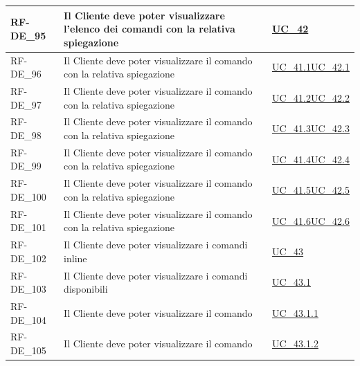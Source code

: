 \begin{longtable}{|>{\raggedright}p{}|>{\raggedright\arraybackslash}p{}|>{\raggedright\arraybackslash}p{}|}
	\hline
	RF-DE\_95 \hypertarget{rf-de_95} & Il Cliente deve poter visualizzare l'elenco dei comandi con la relativa spiegazione & \hyperref[uc_42]{UC\_42} \\
	\hline
	RF-DE\_96 \hypertarget{rf-de_96} & Il Cliente deve poter visualizzare il comando \vr{/duplica} con la relativa spiegazione & \hyperref[uc_41.1]{UC\_41.1}\newline \hyperref[uc_42.1]{UC\_42.1} \\
	\hline
	RF-DE\_97 \hypertarget{rf-de_97} & Il Cliente deve poter visualizzare il comando \vr{/carrello} con la relativa spiegazione & \hyperref[uc_41.2]{UC\_41.2}\newline \hyperref[uc_42.2]{UC\_42.2} \\
	\hline
	RF-DE\_98 \hypertarget{rf-de_98} & Il Cliente deve poter visualizzare il comando \vr{/duplica\{xx\}} con la relativa spiegazione & \hyperref[uc_41.3]{UC\_41.3}\newline \hyperref[uc_42.3]{UC\_42.3} \\
	\hline
	RF-DE\_99 \hypertarget{rf-de_99} & Il Cliente deve poter visualizzare il comando \vr{/invia} con la relativa spiegazione & \hyperref[uc_41.4]{UC\_41.4}\newline \hyperref[uc_42.4]{UC\_42.4} \\
	\hline
	RF-DE\_100 \hypertarget{rf-de_100} & Il Cliente deve poter visualizzare il comando \vr{/annulla} con la relativa spiegazione & \hyperref[uc_41.5]{UC\_41.5}\newline \hyperref[uc_42.5]{UC\_42.5} \\
	\hline
	RF-DE\_101 \hypertarget{rf-de_101} & Il Cliente deve poter visualizzare il comando \vr{/comandi} con la relativa spiegazione & \hyperref[uc_41.6]{UC\_41.6}\newline \hyperref[uc_42.6]{UC\_42.6} \\
	\hline
	RF-DE\_102 \hypertarget{rf-de_102} & Il Cliente deve poter visualizzare i comandi inline & \hyperref[uc_43]{UC\_43} \\
	\hline
	RF-DE\_103 \hypertarget{rf-de_103} & Il Cliente deve poter visualizzare i comandi disponibili & \hyperref[uc_43.1]{UC\_43.1} \\
	\hline
	RF-DE\_104 \hypertarget{rf-de_104} & Il Cliente deve poter visualizzare il comando \vr{/duplica} & \hyperref[uc_43.1.1]{UC\_43.1.1} \\
	\hline
	RF-DE\_105 \hypertarget{rf-de_105} & Il Cliente deve poter visualizzare il comando \vr{/carrello} & \hyperref[uc_43.1.2]{UC\_43.1.2} \\

\end{longtable}
